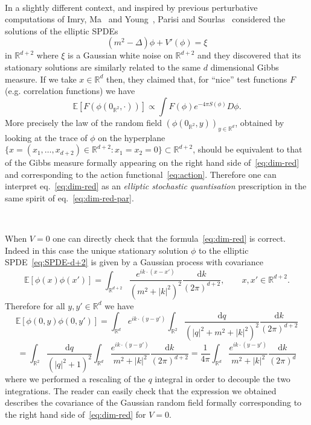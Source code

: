 \documentclass[a4paper,10pt]{article}
\newcommand{\mathd}{\mathrm{d}}
\newcommand{\tmtextit}[1]{{\itshape{#1}}}
\begin{document}
\

In a slightly different context, and inspired by previous perturbative
computations of Imry, Ma~{\cite{imry_random_field_1975}} and
Young~{\cite{young_lowering_1977}}, Parisi and
Sourlas~{\cite{parisi_random_1979,parisi_supersymmetric_1982}} considered the
solutions of the elliptic SPDEs
\begin{equation}
  (m^2 - \Delta) \phi + V' (\phi) = \xi \label{eq:SPDE-d+2}
\end{equation}
in $\mathbb{R}^{d + 2}$ where $\xi$ is a Gaussian white noise on
$\mathbb{R}^{d + 2}$ and they discovered that its stationary solutions are
similarly related to the same $d$ dimensional Gibbs measure. If we take $x \in
\mathbb{R}^d$ then, they claimed that, for ``nice'' test functions $F$ (e.g.
correlation functions) we have
\begin{equation}
  \mathbb{E} [F (\phi (0_{\mathbb{R}^2}, \cdot))] \propto \int F (\phi) e^{- 4
  \pi S (\phi)} D \phi . \label{eq:dim-red}
\end{equation}
More precisely the law of the random field $(\phi (0_{\mathbb{R}^2}, y))_{y
\in \mathbb{R}^d}$, obtained by looking at the trace of $\phi$ on the
hyperplane $\{ x = (x_1, \ldots, x_{d + 2}) \in \mathbb{R}^{d + 2} : x_1 = x_2
= 0 \} \subset \mathbb{R}^{d + 2}$, should be equivalent to that of the Gibbs
measure formally appearing on the right hand side of~{\eqref{eq:dim-red}} and
corresponding to the action functional~{\eqref{eq:action}}. Therefore one can
interpret eq.~{\eqref{eq:dim-red}} as an \tmtextit{elliptic stochastic
quantisation} prescription in the same spirit of eq.~{\eqref{eq:dim-red-par}}.

\

When $V = 0$ one can directly check that the formula~{\eqref{eq:dim-red}} is
correct. Indeed in this case the unique stationary solution $\phi$ to the
elliptic SPDE~{\eqref{eq:SPDE-d+2}} is given by a Gaussian process with
covariance
\[ \mathbb{E} [\phi (x) \phi (x')] = \int_{\mathbb{R}^{d + 2}} \frac{e^{i k
   \cdot (x - x')}}{(m^2 + | k |^2)^2} \frac{\mathd k}{(2 \pi)^{d + 2}},
   \qquad x, x' \in \mathbb{R}^{d + 2} . \]
Therefore for all $y, y' \in \mathbb{R}^d$ we have
\[ \mathbb{E} [\phi (0, y) \phi (0, y')] = \int_{\mathbb{R}^d} e^{i k \cdot (y
   - y')} \int_{\mathbb{R}^2} \frac{\mathd q}{(| q |^2 + m^2 + | k |^2)^2}
   \frac{\mathd k}{(2 \pi)^{d + 2}} \]
\[ = \int_{\mathbb{R}^2} \frac{\mathd q}{(| q |^2 + 1)^2} \int_{\mathbb{R}^d}
   \frac{e^{i k \cdot (y - y')}}{m^2 + | k |^2} \frac{\mathd k}{(2 \pi)^{d +
   2}} = \frac{1}{4 \pi} \int_{\mathbb{R}^d} \frac{e^{i k \cdot (y - y')}}{m^2
   + | k |^2} \frac{\mathd k}{(2 \pi)^d} \]
where we performed a rescaling of the $q$ integral in order to decouple the
two integrations. The reader can easily check that the expression we obtained
describes the covariance of the Gaussian random field formally corresponding
to the right hand side of~{\eqref{eq:dim-red}} for $V = 0$.
\end{document}
